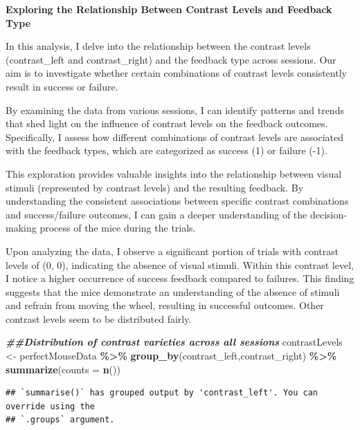 \documentclass[
]{article}
\newenvironment{Shaded}{\begin{snugshade}}{\end{snugshade}}
\newcommand{\AttributeTok}[1]{\textcolor[rgb]{0.13,0.29,0.53}{#1}}
\newcommand{\DocumentationTok}[1]{\textcolor[rgb]{0.56,0.35,0.01}{\textbf{\textit{#1}}}}
\newcommand{\FunctionTok}[1]{\textcolor[rgb]{0.13,0.29,0.53}{\textbf{#1}}}
\newcommand{\NormalTok}[1]{#1}
\newcommand{\OtherTok}[1]{\textcolor[rgb]{0.56,0.35,0.01}{#1}}
\newcommand{\SpecialCharTok}[1]{\textcolor[rgb]{0.81,0.36,0.00}{\textbf{#1}}}
\begin{document}
\textbf{Exploring the Relationship Between Contrast Levels and Feedback
Type}

In this analysis, I delve into the relationship between the contrast
levels (contrast\_left and contrast\_right) and the feedback type across
sessions. Our aim is to investigate whether certain combinations of
contrast levels consistently result in success or failure.

By examining the data from various sessions, I can identify patterns and
trends that shed light on the influence of contrast levels on the
feedback outcomes. Specifically, I assess how different combinations of
contrast levels are associated with the feedback types, which are
categorized as success (1) or failure (-1).

This exploration provides valuable insights into the relationship
between visual stimuli (represented by contrast levels) and the
resulting feedback. By understanding the consistent associations between
specific contrast combinations and success/failure outcomes, I can gain
a deeper understanding of the decision-making process of the mice during
the trials.

Upon analyzing the data, I observe a significant portion of trials with
contrast levels of (0, 0), indicating the absence of visual stimuli.
Within this contrast level, I notice a higher occurrence of success
feedback compared to failures. This finding suggests that the mice
demonstrate an understanding of the absence of stimuli and refrain from
moving the wheel, resulting in successful outcomes. Other contrast
levels seem to be distributed fairly.

\begin{Shaded}
\begin{Highlighting}[]
\DocumentationTok{\#\#Distribution of contrast varieties across all sessions}
\NormalTok{contrastLevels }\OtherTok{\textless{}{-}}\NormalTok{  perfectMouseData }\SpecialCharTok{\%\textgreater{}\%} \FunctionTok{group\_by}\NormalTok{(contrast\_left,contrast\_right) }\SpecialCharTok{\%\textgreater{}\%} \FunctionTok{summarize}\NormalTok{(}\AttributeTok{counts =} \FunctionTok{n}\NormalTok{()) }
\end{Highlighting}
\end{Shaded}

\begin{verbatim}
## `summarise()` has grouped output by 'contrast_left'. You can override using the
## `.groups` argument.
\end{verbatim}
\end{document}
